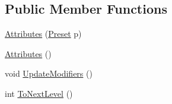 \subsection*{Public Member Functions}
\begin{DoxyCompactItemize}
\item 
\mbox{\hyperlink{class_attributes_ae0e1759f4338f340c6fec4e4d0908ff1}{Attributes}} (\mbox{\hyperlink{class_attributes_a2dcc4757e5dd7b7d518f43f4f194d175}{Preset}} p)
\item 
\mbox{\hyperlink{class_attributes_a1821e0b3d7eff63215bba4e8d68d3740}{Attributes}} ()
\item 
void \mbox{\hyperlink{class_attributes_a73fffc9279e2b2307003d347485ff77b}{Update\+Modifiers}} ()
\item 
int \mbox{\hyperlink{class_attributes_a413dfd410d573f7200c07ce9872598fb}{To\+Next\+Level}} ()
\end{DoxyCompactItemize}
